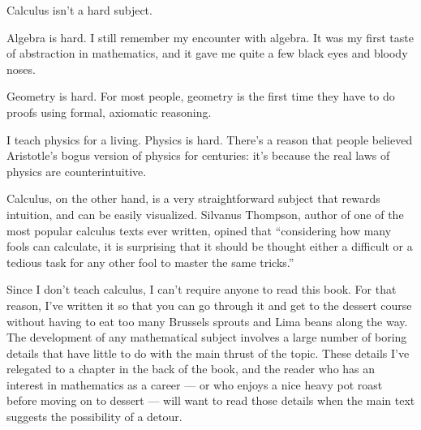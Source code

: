 
Calculus isn't a hard subject.

Algebra is hard. I still remember my encounter with
algebra. It was my first taste of abstraction in mathematics,
and it gave me quite a few black eyes and bloody noses.

Geometry is hard. For most people, geometry is the first time
they have to do proofs using formal, axiomatic reasoning.

I teach physics for a living. Physics is hard. There's a reason
that people believed Aristotle's bogus version of physics for
centuries: it's because the real laws of physics are counterintuitive.

Calculus, on the other hand, is a very straightforward subject that
rewards intuition, and can be easily visualized. Silvanus Thompson,
author of one of the most popular calculus texts ever written,
opined that ``considering how many fools can calculate, it is
surprising that it should be thought either a difficult or
a tedious task for any other fool to master the same tricks.''

Since I don't teach calculus, I can't require anyone to read this
book. For that reason, I've written it so that you can go through it
and get to the dessert course without having to eat too many Brussels
sprouts and Lima beans along the way. The development of any mathematical
subject involves a large number of boring details that have little
to do with the main thrust of the topic. These details I've relegated
to a chapter in the back of the book, and the reader who has an
interest in mathematics as a career --- or who enjoys a nice heavy
pot roast before moving on to dessert --- will want to read those
details when the main text suggests the possibility of a detour.

